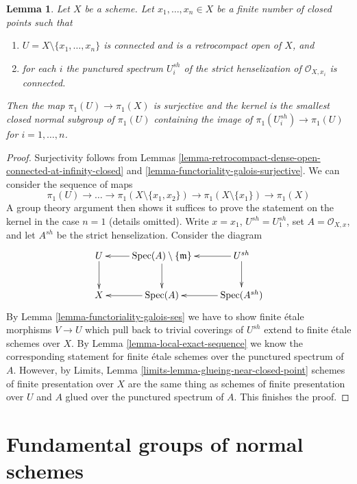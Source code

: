 \documentclass{stacks-project}
\theoremstyle{plain}
\newtheorem{lemma}[subsection]{Lemma}
\theoremstyle{definition}
\theoremstyle{remark}
\numberwithin{equation}{subsection}
\def\Spec{\mathop{\mathrm{Spec}}}
\begin{document}
\begin{lemma}
\label{lemma-exact-sequence-finite-nr-closed-pts}
Let $X$ be a scheme. Let $x_1, \ldots, x_n \in X$ be a finite
number of closed points such that
\begin{enumerate}
\item $U = X \setminus \{x_1, \ldots, x_n\}$ is connected and is
a retrocompact open of $X$, and
\item for each $i$ the punctured spectrum $U_i^{sh}$ of the
strict henselization of $\mathcal{O}_{X, x_i}$ is connected.
\end{enumerate}
Then the map $\pi_1(U) \to \pi_1(X)$ is surjective and the kernel
is the smallest closed normal subgroup of $\pi_1(U)$ containing
the image of $\pi_1(U_i^{sh}) \to \pi_1(U)$ for $i = 1, \ldots, n$.
\end{lemma}

\begin{proof}
Surjectivity follows from
Lemmas \ref{lemma-retrocompact-dense-open-connected-at-infinity-closed} and
\ref{lemma-functoriality-galois-surjective}.
We can consider the sequence of maps
$$
\pi_1(U)  \to \ldots \to
\pi_1(X \setminus \{x_1, x_2\}) \to \pi_1(X \setminus \{x_1\}) \to \pi_1(X)
$$
A group theory argument then shows it suffices to prove the statement on the
kernel in the case $n = 1$ (details omitted). Write
$x = x_1$, $U^{sh} = U_1^{sh}$,
set $A = \mathcal{O}_{X, x}$, and let $A^{sh}$ be the strict henselization.
Consider the diagram
$$
\xymatrix{
U \ar[d] &
\Spec(A) \setminus \{\mathfrak m\} \ar[l] \ar[d] &
U^{sh} \ar[d] \ar[l] \\
X & \Spec(A) \ar[l] & \Spec(A^{sh}) \ar[l]
}
$$
By Lemma \ref{lemma-functoriality-galois-ses}
we have to show finite \'etale morphisms
$V \to U$ which pull back to trivial coverings of $U^{sh}$
extend to finite \'etale schemes over $X$.
By Lemma \ref{lemma-local-exact-sequence}
we know the corresponding statement
for finite \'etale schemes over the punctured spectrum of $A$.
However, by Limits, Lemma \ref{limits-lemma-glueing-near-closed-point}
schemes of finite presentation over $X$ are the same thing as
schemes of finite presentation over $U$ and $A$ glued over
the punctured spectrum of $A$. This finishes the proof.
\end{proof}









\section{Fundamental groups of normal schemes}
\label{section-normal}
\end{document}
